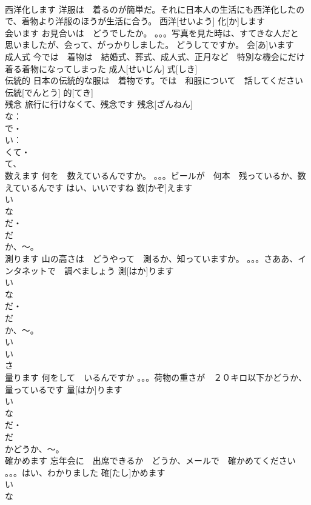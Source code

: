 \documentclass[8pt]{extreport}
\begin{document}
\begin{CJK}{UTF8}{min}
\\	西洋化します	洋服は　着るのが簡単だ。それに日本人の生活にも西洋化したので、着物より洋服のほうが生活に合う。	西洋[せいよう] 化[か]します			
\\	会います	お見合いは　どうでしたか。 。。。写真を見た時は、すてきな人だと　思いましたが、会って、がっかりしました。 どうしてですか。	会[あ]います			
\\	成人式	今では　着物は　結婚式、葬式、成人式、正月など　特別な機会にだけ　着る着物になってしまった	成人[せいじん] 式[しき]					
\\	伝統的	日本の伝統的な服は　着物です。では　和服について　話してください	伝統[でんとう] 的[てき]			
\\	残念	旅行に行けなくて、残念です	残念[ざんねん]			
\\	な：
\\	で・
\\	い： 
\\	くて・
\\	て、
\\	数えます	何を　数えているんですか。 。。。ビールが　何本　残っているか、数えているんです はい、いいですね	数[かぞ]えます			
\\	い　
\\	な
\\	だ・
\\	だ 
\\	か、～。
\\	測ります	山の高さは　どうやって　測るか、知っていますか。 。。。さああ、インタネットで　調べましょう	測[はか]ります			
\\	い　
\\	な
\\	だ・
\\	だ 
\\	か、～。
\\	い　
\\	い 
\\	さ　
\\	量ります	何をして　いるんですか 。。。荷物の重さが　２０キロ以下かどうか、量っているです	量[はか]ります			
\\	い　
\\	な
\\	だ・
\\	だ 
\\	かどうか、～。
\\	確かめます	忘年会に　出席できるか　どうか、メールで　確かめてください 。。。はい、わかりました	確[たし]かめます			
\\	い　
\\	な

\end{CJK}
\end{document}
